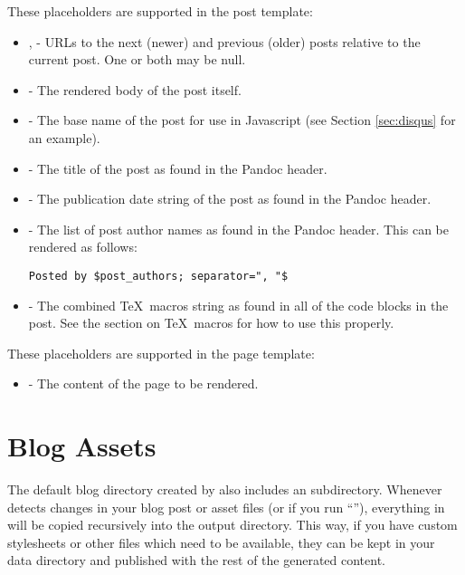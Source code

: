 \documentclass[11pt, letterpaper, oneside, titlepage]{book}
\begin{document}
These placeholders are supported in the post template:

\begin{itemize}
\item{,  - URLs to the
  next (newer) and previous (older) posts relative to the current
  post.  One or both may be null.}
\item{ - The rendered body of the post itself.}
\item{ - The base name of the post for use in
  Javascript (see Section \ref{sec:disqus} for an example).}
\item{ - The title of the post as found in the Pandoc
  header.}
\item{ - The publication date string of the post as
  found in the Pandoc header.}
\item{ - The list of post author names as found in
  the Pandoc header.  This can be rendered as follows:
\begin{verbatim}
Posted by $post_authors; separator=", "$
\end{verbatim}
}
\item{ - The combined \TeX\ macros string as
  found in all of the  code blocks in the post.  See
  the section on \TeX\ macros for how to use this properly.}
\end{itemize}

These placeholders are supported in the page template:

\begin{itemize}
\item{ - The content of the page to be rendered.}
\end{itemize}

\section{Blog Assets}

The default blog directory created by  also includes an
 subdirectory.  Whenever  detects changes in your
blog post or asset files (or if you run ``''), everything in
 will be copied recursively into the output directory.
This way, if you have custom stylesheets or other files which need to
be available, they can be kept in your data directory and published
with the rest of the generated content.
\end{document}
